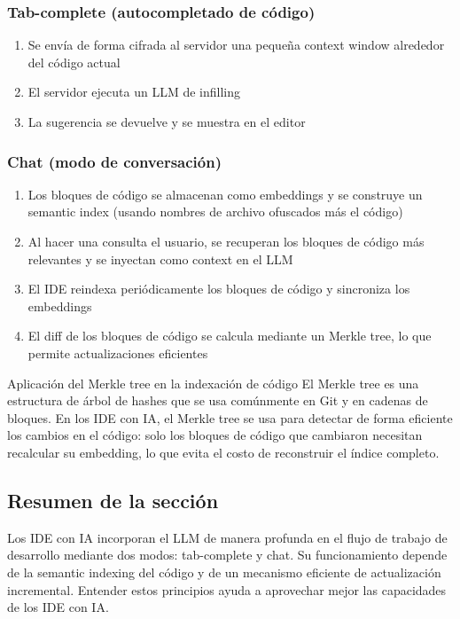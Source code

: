 \documentclass[a4paper]{article}
\begin{document}
\subsubsection{Tab-complete (autocompletado de código)}

\begin{enumerate}
    \item Se envía de forma cifrada al servidor una pequeña context window alrededor del código actual
    \item El servidor ejecuta un LLM de infilling
    \item La sugerencia se devuelve y se muestra en el editor
\end{enumerate}

\subsubsection{Chat (modo de conversación)}

\begin{enumerate}
    \item Los bloques de código se almacenan como embeddings y se construye un semantic index (usando nombres de archivo ofuscados más el código)
    \item Al hacer una consulta el usuario, se recuperan los bloques de código más relevantes y se inyectan como context en el LLM
    \item El IDE reindexa periódicamente los bloques de código y sincroniza los embeddings
    \item El diff de los bloques de código se calcula mediante un Merkle tree, lo que permite actualizaciones eficientes
\end{enumerate}

\begin{importantbox}{Aplicación del Merkle tree en la indexación de código}
El Merkle tree es una estructura de árbol de hashes que se usa comúnmente en Git y en cadenas de bloques. En los IDE con IA, el Merkle tree se usa para detectar de forma eficiente los cambios en el código: solo los bloques de código que cambiaron necesitan recalcular su embedding, lo que evita el costo de reconstruir el índice completo.
\end{importantbox}

\subsection{Resumen de la sección}

Los IDE con IA incorporan el LLM de manera profunda en el flujo de trabajo de desarrollo mediante dos modos: tab-complete y chat. Su funcionamiento depende de la semantic indexing del código y de un mecanismo eficiente de actualización incremental. Entender estos principios ayuda a aprovechar mejor las capacidades de los IDE con IA.
\end{document}
